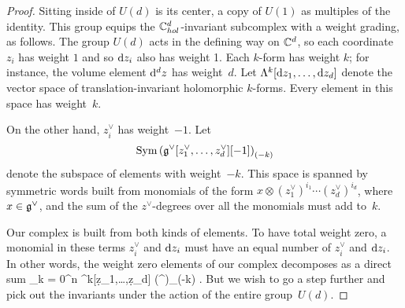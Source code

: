\begin{proof}
Sitting inside of $U(d)$ is its center, a copy of $U(1)$ as multiples of the identity.
This group equips the $\mathbb C^d_{hol}$-invariant subcomplex with a weight grading, as follows.
The group $U(d)$ acts in the defining way on $\mathbb C^d$,
so each coordinate $z_i$ has weight $1$ and so ${\rm d} z_i$ also has weight 1.
Each $k$-form has weight $k$; for instance, the volume element ${\rm d}^d z$ has weight~$d$.
Let $\Lambda^k[{\rm d} z_1,\ldots,{\rm d} z_d]$ denote the vector space of translation-invariant holomorphic $k$-forms.
Every element in this space has weight~$k$.

On the other hand, $z_i^\vee$ has weight~$-1$. 
Let 
\[
{\rm Sym} \left(\mathfrak g^\vee [z_1^\vee,\ldots,z_d^\vee][-1] \right)_{(-k)}
\]
denote the subspace of elements with weight~$-k$.
This space is spanned by symmetric words built from monomials of the form $x \otimes (z_1^\vee)^{i_1} \cdots (z_d^\vee)^{i_d}$, where $x \in \mathfrak g^\vee$,
and the sum of the $z^\vee$-degrees over all the monomials must add to~$k$.

Our complex is built from both kinds of elements.
To have total weight zero, a monomial in these terms $z_i^\vee$ and ${\rm d} z_i$ must have an equal number of $z_i^\vee$ and ${\rm d} z_i$.
In other words, the weight zero elements of our complex decomposes as a direct sum
\beqn
\bigoplus_{k = 0}^n \Lambda^k[\d z_1,\ldots,\d z_d] \otimes \Sym \left(\fg^ \right)_{(-k)} .
\eeqn
But we wish to go a step further and pick out the invariants under the action of the entire group~$U(d)$.


\end{proof}
